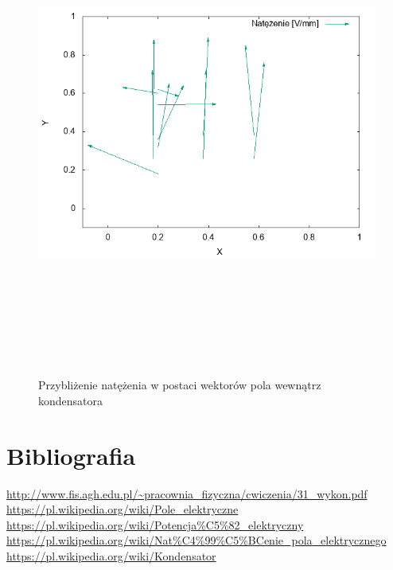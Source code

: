 \documentclass[a4paper,12pt]{article}
\begin{document}
\begin{justify}
\begin{figure}[h]
\centering
\includegraphics[width=18cm, height=16cm]{plotw}
\caption{Przybliżenie natężenia w postaci wektorów pola wewnątrz kondensatora}
\end{figure}

\section{Bibliografia}

\begingroup
\renewcommand{\section}[2]{}%
\begin{thebibliography}{}
 \url{http://www.fis.agh.edu.pl/~pracownia_fizyczna/cwiczenia/31_wykon.pdf}
 \url{https://pl.wikipedia.org/wiki/Pole_elektryczne}
 \url{https://pl.wikipedia.org/wiki/Potencja%C5%82_elektryczny}
 \url{https://pl.wikipedia.org/wiki/Nat%C4%99%C5%BCenie_pola_elektrycznego}
 \url{https://pl.wikipedia.org/wiki/Kondensator}
\end{thebibliography}
\endgroup

\end{justify}
\end{document}
